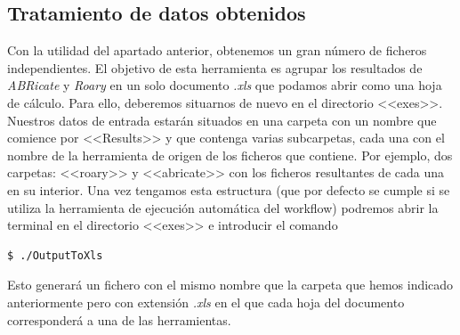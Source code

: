 \subsection{Tratamiento de datos obtenidos}
Con la utilidad del apartado anterior, obtenemos un gran número de ficheros independientes. El objetivo de esta herramienta es agrupar los resultados de \textit{ABRicate} y \textit{Roary} en un solo documento \textit{.xls} que podamos abrir como una hoja de cálculo. Para ello, deberemos situarnos de nuevo en el directorio <<exes>>. Nuestros datos de entrada estarán situados en una carpeta con un nombre que comience por <<Results>> y que contenga varias subcarpetas, cada una con el nombre de la herramienta de origen de los ficheros que contiene. Por ejemplo, dos carpetas: <<roary>> y <<abricate>> con los ficheros resultantes de cada una en su interior. Una vez tengamos esta estructura (que por defecto se cumple si se utiliza la herramienta de ejecución automática del workflow) podremos abrir la terminal en el directorio <<exes>> e introducir el comando
\begin{lstlisting}[language=bash]
    $ ./OutputToXls
\end{lstlisting}
Esto generará un fichero con el mismo nombre que la carpeta que hemos indicado anteriormente pero con extensión \textit{.xls} en el que cada hoja del documento corresponderá a una de las herramientas.
\newpage \thispagestyle{empty} %